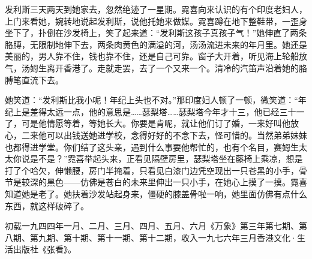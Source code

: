 \par 发利斯三天两天到她家去，忽然绝迹了一星期。霓喜向来认识的有个印度老妇人，上门来看她，婉转地说起发利斯，说他托她来做媒。霓喜蹲在地下整鞋带，一歪身坐下了，扑倒在沙发椅上，笑了起来道：“发利斯这孩子真孩子气！”她伸直了两条胳膊，无限制地伸下去，两条肉黄色的满溢的河，汤汤流进未来的年月里。她还是美丽的，男人靠不住，钱也靠不住，还是自己可靠。窗子大开着，听见海上轮船放气，汤姆生离开香港了。走就走罢，去了一个又来一个。清冷的汽笛声沿着她的胳膊笔直流下去。
\par 她笑道：“发利斯比我小呢！年纪上头也不对。”那印度妇人顿了一顿，微笑道：“年纪上是差得太远一点，他的意思是……瑟梨塔……瑟梨塔今年才十三，他已经三十一了，可是他情愿等着，等她长大。你要是肯呢，就让他们订了婚，一来好叫他放心，二来他可以出钱送她进学校，念得好好的不念下去，怪可惜的。当然弟弟妹妹也都得进学堂。你们结了这头亲，遇到什么事要他帮忙的，也有个名目，赛姆生太太你说是不是？”霓喜举起头来，正看见隔壁房里，瑟梨塔坐在藤椅上乘凉，想是打了个哈欠，伸懒腰，房门半掩着，只看见白漆门边凭空现出一只苍黑的小手，骨节是较深的黑色——仿佛是苍白的未来里伸出一只小手，在她心上摸了一摸。霓喜知道她是老了。她扶着沙发站起身来，僵硬的膝盖骨啦一响，她里面仿佛有点什么东西，就这样破碎了。
\par {}
\par *初载一九四四年一月、二月、三月、四月、五月、六月《万象》第三年第七期、第八期、第九期、第十期、第十一期、第十二期，收入一九七六年三月香港文化·生活出版社《张看》。

